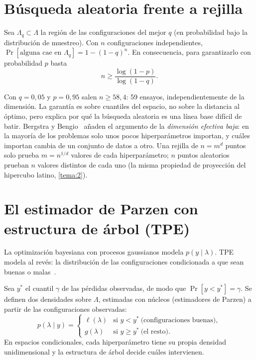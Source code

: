 \addtocounter{definicion}{1}%

\section{Búsqueda aleatoria frente a rejilla}

\begin{proposicion}\label{prop:aleatoria}
Sea $\Lambda_q\subset\Lambda$ la región de las configuraciones del mejor $q$ (en probabilidad bajo la distribución de muestreo). Con $n$ configuraciones independientes, $\Pr[\text{alguna cae en }\Lambda_q]=1-(1-q)^n$. En consecuencia, para garantizarlo con probabilidad $p$ basta
\[
n\ge\frac{\log(1-p)}{\log(1-q)} .
\]
\end{proposicion}

Con $q=0{,}05$ y $p=0{,}95$ salen $n\ge 58{,}4$: 59 ensayos, independientemente de la dimensión. La garantía es sobre cuantiles del espacio, no sobre la distancia al óptimo, pero explica por qué la búsqueda aleatoria es una línea base difícil de batir. Bergstra y Bengio~\cite{bergstra12} añaden el argumento de la \emph{dimensión efectiva baja}: en la mayoría de los problemas solo unos pocos hiperparámetros importan, y cuáles importan cambia de un conjunto de datos a otro. Una rejilla de $n=m^d$ puntos solo prueba $m=n^{1/d}$ valores de cada hiperparámetro; $n$ puntos aleatorios prueban $n$ valores distintos de cada uno (la misma propiedad de proyección del hipercubo latino, \cref{tema:2}).

\section{El estimador de Parzen con estructura de árbol (TPE)}

La optimización bayesiana con procesos gaussianos modela $p(y\mid\lambda)$. TPE modela al revés: la distribución de las configuraciones condicionada a que sean buenas o malas~\cite[§4]{tpe}.

\begin{definicion}[TPE]\label{def:tpe}
Sea $y^*$ el cuantil $\gamma$ de las pérdidas observadas, de modo que $\Pr[y<y^*]=\gamma$. Se definen dos densidades sobre $\Lambda$, estimadas con núcleos (estimadores de Parzen) a partir de las configuraciones observadas:
\[
p(\lambda\mid y)=\begin{cases}\ell(\lambda)&\text{si } y<y^*\ \text{(configuraciones buenas)},\\ g(\lambda)&\text{si } y\ge y^*\ \text{(el resto)}.\end{cases}
\]
En espacios condicionales, cada hiperparámetro tiene su propia densidad unidimensional y la estructura de árbol decide cuáles intervienen.
\end{definicion}

